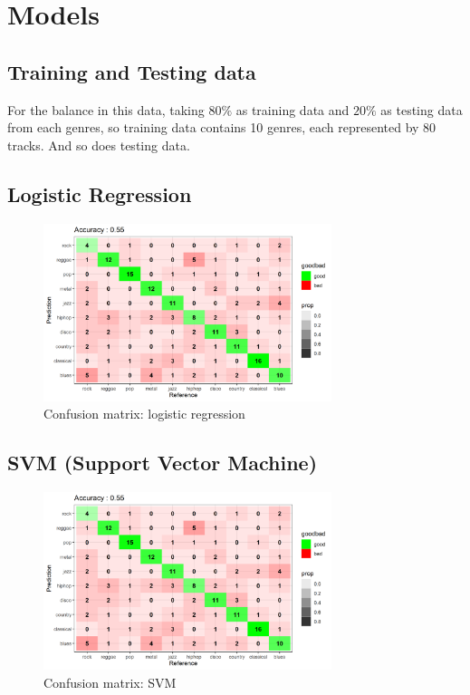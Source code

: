 \documentclass[12pt,a4paper]{article}
\begin{document}
\section{Models}
\subsection{Training and Testing data}
For the balance in this data, taking $80\%$ as training data and $20\%$ as testing data from each genres, so training data contains 10 genres, each represented by 80 tracks. And so does testing data.

\subsection{Logistic Regression}
\begin{figure}[h]
    \includegraphics[width=0.75\textwidth]{confusionMatrix_logreg.png}
    \caption{Confusion matrix: logistic regression}
\end{figure}

\newpage

\subsection{SVM (Support Vector Machine)}
\begin{figure}[h]
    \includegraphics[width=0.75\textwidth]{confusionMatrix_logreg.png}
    \caption{Confusion matrix: SVM}
\end{figure}
\end{document}
